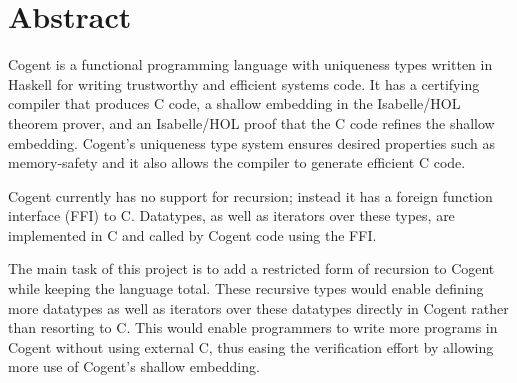 \chapter*{Abstract}\label{abstract}

Cogent is a functional programming language with uniqueness types written in Haskell for writing trustworthy and efficient systems code.
It has a certifying compiler that produces C code, a shallow embedding in the Isabelle/HOL theorem prover,
and an Isabelle/HOL proof that the C code refines the shallow embedding.
Cogent's uniqueness type system ensures desired properties such as memory-safety and it also allows the compiler to generate efficient C code.

Cogent currently has no support for recursion; instead it has a foreign function interface (FFI) to C.
Datatypes, as well as iterators over these types, are implemented in C and called by Cogent code using the FFI.

The main task of this project is to add a restricted form of recursion to Cogent while keeping the language total.
These recursive types would enable defining more datatypes as well as iterators over these datatypes directly in Cogent rather than resorting to C.
This would enable programmers to write more programs in Cogent without using external C, thus easing the verification effort
by allowing more use of Cogent's shallow embedding.